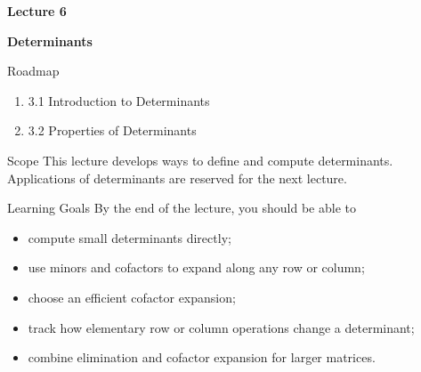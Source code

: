 \begin{frame}[plain]
  \vfill
  {\Huge\color{lecturegreen}\bfseries Lecture 6}
  \bigskip

  {\Huge\color{lecturegreen}\bfseries Determinants}
  \vfill
\end{frame}

\begin{frame}{Roadmap}
  \begin{enumerate}
    \item 3.1 Introduction to Determinants
    \item 3.2 Properties of Determinants
  \end{enumerate}
  \medskip
  \begin{block}{Scope}
    This lecture develops ways to define and compute determinants. Applications of
    determinants are reserved for the next lecture.
  \end{block}
\end{frame}

\begin{frame}{Learning Goals}
  By the end of the lecture, you should be able to
  \begin{itemize}
    \item compute small determinants directly;
    \item use minors and cofactors to expand along any row or column;
    \item choose an efficient cofactor expansion;
    \item track how elementary row or column operations change a determinant;
    \item combine elimination and cofactor expansion for larger matrices.
  \end{itemize}
\end{frame}

